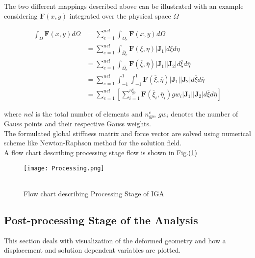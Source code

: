 \documentclass[11pt]{article}
\begin{document}
The two different mappings described above can be illustrated with an example
considering $ \textbf{F}(x,y)$ integrated over the physical space $\Omega$

\begin{equation*}
\begin{split}
\int_{\Omega} \textbf{F}(x,y)d\Omega & = \sum_{e=1}^{nel} \int_{\Omega_e}
\textbf{F}(x,y) d\Omega  \\
& = \sum_{e=1}^{nel} \int_{\widetilde{\Omega_e}}
\textbf{F}(\xi,\eta)|\textbf{J}_1| d\xi d\eta \\
& = \sum_{e=1}^{nel} \int_{\overline{\Omega_e}}
\textbf{F}(\overline\xi,\overline\eta)|\textbf{J}_1||\textbf{J}_2| d\overline\xi
d\overline\eta  \\
& = \sum_{e=1}^{nel} \int_{-1}^{1} \int_{-1}^{1}
\textbf{F}(\overline\xi,\overline\eta)|\textbf{J}_1||\textbf{J}_2| d\overline\xi
d\overline\eta  \\
& = \sum_{e=1}^{nel} \left[ \sum_{i=1}^{n_{gp}^e}
\textbf{F}(\overline\xi_i,\overline\eta_i) gw_i |\textbf{J}_1||\textbf{J}_2|
d\overline\xi d\overline\eta \right]
\end{split}
\end{equation*}

\noindent
where $nel$ is the total number of elements and $n_{gp}^e$, $gw_i$ denotes the
number of Gauss points and their respective Gauss weights.\\
\noindent
The formulated global stiffness matrix and force vector are solved using
numerical scheme like Newton-Raphson method for the solution field.
\\A flow chart describing processing stage flow is shown in Fig.(\ref{Processing})
\begin{figure}[H]
	\begin{center}
		\texttt{[image: Processing.png]} 
		\caption{\\Flow chart describing Processing Stage of IGA}\label{Processing}
	\end{center}
\end{figure}

\subsection{Post-processing Stage of the Analysis}
This section deals with visualization of the deformed geometry and how a
displacement and solution dependent variables are plotted. 
\end{document}
